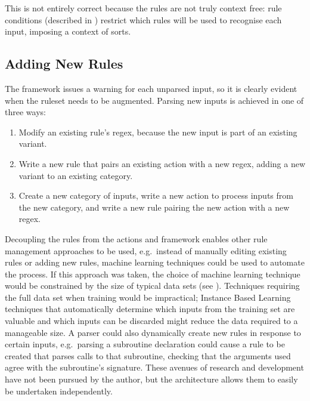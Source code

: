 This is not entirely correct because the rules are not truly context free:
rule conditions (described in )
restrict which rules will be used to recognise each input, imposing a
context of sorts.

\subsection{Adding New Rules}

\label{adding new rules in architecture}

The framework issues a warning for each unparsed input, so it is clearly
evident when the ruleset needs to be augmented.  Parsing new inputs is
achieved in one of three ways:

\begin{enumerate}

    \item Modify an existing rule's regex, because the new input is part of
        an existing variant.

    \item Write a new rule that pairs an existing action with a new regex,
        adding a new variant to an existing category.

    \item Create a new category of inputs, write a new action to process
        inputs from the new category, and write a new rule pairing the new
        action with a new regex.

\end{enumerate}

Decoupling the rules from the actions and framework enables other rule
management approaches to be used, e.g.\ instead of manually editing
existing rules or adding new rules, machine learning techniques could be
used to automate the process.  If this approach was taken, the choice of
machine learning technique would be constrained by the size of typical data
sets (see ).  Techniques requiring the full
data set when training would be impractical; Instance Based
Learning~\cite{instance-based-learning} techniques that automatically
determine which inputs from the training set are valuable and which inputs
can be discarded might reduce the data required to a manageable size.  A
parser could also dynamically create new rules in response to certain
inputs, e.g.\ parsing a subroutine declaration could cause a rule to be
created that parses calls to that subroutine, checking that the arguments
used agree with the subroutine's signature.  These avenues of research and
development have not been pursued by the author, but the architecture
allows them to easily be undertaken independently.

